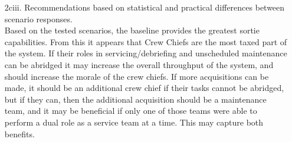 \documentclass[answers]{exam}
\begin{document}
\begin{questions}
\begin{enumerate}
\begin{solution}
\begin{enumerate}
		\item[2ciii.] Recommendations based on statistical and practical differences between scenario responses. \\
			Based on the tested scenarios, the baseline provides the greatest sortie capabilities.
			From this it appears that Crew Chiefs are the most taxed part of the system.
			If their roles in servicing/debriefing and unscheduled maintenance can be abridged
			it may increase the overall throughput of the system, and should increase the morale
			of the crew chiefs.
			If more acquisitions can be made, it should be an additional crew chief if their tasks
			cannot be abridged, but if they can, then the additional acquisition should be a maintenance
			team, and it may be beneficial if only one of those teams were
			able to perform a dual role as a service team at a time.
			This may capture both benefits.
		
	\end{enumerate}	
	\end{solution}
\end{enumerate}


\end{questions}
\end{document}
